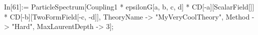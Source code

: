 In[61]:= ParticleSpectrum[Coupling1 * epsilonG[a, b, c, d] * CD[-a][ScalarField[]] * CD[-b][TwoFormField[-c, -d]], TheoryName -> "MyVeryCoolTheory", Method -> "Hard", MaxLaurentDepth -> 3]; 
